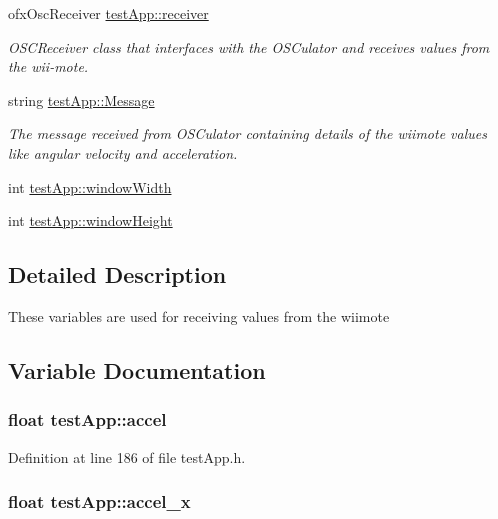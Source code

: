 \begin{DoxyCompactItemize}
ofx\-Osc\-Receiver \hyperlink{group___wii_mote_variables_ga034c44ff60fa1e5f021e90d5410ba657}{test\-App\-::receiver}
\begin{DoxyCompactList}\small\item\em O\-S\-C\-Receiver class that interfaces with the O\-S\-Culator and receives values from the wii-\/mote. \end{DoxyCompactList}\item 
string \hyperlink{group___wii_mote_variables_ga0124035d0454fb6bd9152f8a87c40677}{test\-App\-::\-Message}
\begin{DoxyCompactList}\small\item\em The message received from O\-S\-Culator containing details of the wiimote values like angular velocity and acceleration. \end{DoxyCompactList}\item 
int \hyperlink{group___wii_mote_variables_ga9ed611377cd46f5148a3a3d538e96484}{test\-App\-::window\-Width}
\item 
int \hyperlink{group___wii_mote_variables_ga4e8884eeef5b2657b62278969d4e3dcf}{test\-App\-::window\-Height}
\end{DoxyCompactItemize}


\subsection{Detailed Description}
These variables are used for receiving values from the wiimote 

\subsection{Variable Documentation}
\hypertarget{group___wii_mote_variables_ga8e560e923c82d421857538e4a5927542}{
\subsubsection[{accel}]{\setlength{\rightskip}{0pt plus 5cm}float test\-App\-::accel}}\label{group___wii_mote_variables_ga8e560e923c82d421857538e4a5927542}


Definition at line 186 of file test\-App.\-h.

\hypertarget{group___wii_mote_variables_gad1738ff98d225f80b853a9ddc9f5a116}{
\subsubsection[{accel\-\_\-x}]{\setlength{\rightskip}{0pt plus 5cm}float test\-App\-::accel\-\_\-x}}\label{group___wii_mote_variables_gad1738ff98d225f80b853a9ddc9f5a116}


